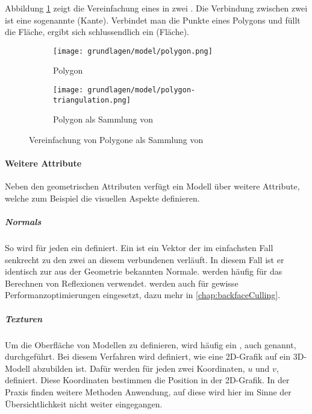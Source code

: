 \pagebreak

Abbildung \ref{fig:modelSimpleTriangulation} zeigt die Vereinfachung eines  in zwei . Die Verbindung zwischen zwei  ist eine sogenannte  (Kante).
Verbindet man die Punkte eines Polygons und füllt die Fläche, ergibt sich schlussendlich ein  (Fläche).

\begin{figure}[H]
  \centering
  \begin{subfigure}{.5\textwidth}
    \centering
    \texttt{[image: grundlagen/model/polygon.png]}
    \caption{Polygon}
  \end{subfigure}%
  \begin{subfigure}{.5\textwidth}
    \centering
    \texttt{[image: grundlagen/model/polygon-triangulation.png]}
    \caption{Polygon als Sammlung von }
  \end{subfigure}
  \caption{Vereinfachung von Polygone als Sammlung von }
  \label{fig:modelSimpleTriangulation}
\end{figure}

\paragraph{Weitere Attribute}
Neben den geometrischen Attributen verfügt ein Modell über weitere Attribute, welche zum Beispiel die visuellen Aspekte definieren.

\subparagraph{Normals}

So wird für jeden  ein  definiert. Ein  ist ein Vektor der im einfachsten Fall senkrecht zu den zwei an diesem  verbundenen  verläuft. In diesem Fall ist er identisch zur aus der Geometrie bekannten Normale.  werden häufig für das Berechnen von Reflexionen verwendet.
 werden auch für gewisse Performanzoptimierungen eingesetzt, dazu mehr in \autoref{chap:backfaceCulling}.

\subparagraph{Texturen}
Um die Oberfläche von Modellen zu definieren, wird häufig ein , auch  genannt, durchgeführt. Bei diesem Verfahren wird definiert, wie eine 2D-Grafik auf ein 3D-Modell abzubilden ist. Dafür werden für jeden  zwei Koordinaten, $u$ und $v$, definiert. Diese Koordinaten bestimmen die Position in der 2D-Grafik. In der Praxis finden weitere Methoden Anwendung, auf diese wird hier im Sinne der Übersichtlichkeit nicht weiter eingegangen.

